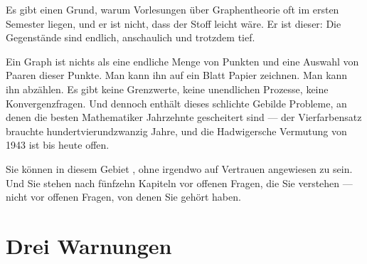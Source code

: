 Es gibt einen Grund, warum Vorlesungen über Graphentheorie oft im ersten Semester liegen, und er ist nicht, dass der Stoff leicht wäre. Er ist dieser: Die Gegenstände sind endlich, anschaulich und trotzdem tief.

Ein Graph ist nichts als eine endliche Menge von Punkten und eine Auswahl von Paaren dieser Punkte. Man kann ihn auf ein Blatt Papier zeichnen. Man kann ihn abzählen. Es gibt keine Grenzwerte, keine unendlichen Prozesse, keine Konvergenzfragen. Und dennoch enthält dieses schlichte Gebilde Probleme, an denen die besten Mathematiker Jahrzehnte gescheitert sind --- der Vierfarbensatz brauchte hundertvierundzwanzig Jahre, und die Hadwigersche Vermutung von 1943 ist bis heute offen.

\begin{merksatz}
\begin{center}
\begin{minipage}{0.9\textwidth}
Sie können in diesem Gebiet , ohne irgendwo auf Vertrauen angewiesen zu sein. Und Sie stehen nach fünfzehn Kapiteln vor offenen Fragen, die Sie verstehen --- nicht vor offenen Fragen, von denen Sie gehört haben.
\end{minipage}
\end{center}
\end{merksatz}

\section*{Drei Warnungen}


